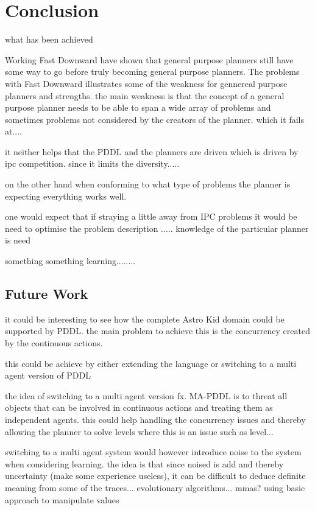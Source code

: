 \section{Conclusion}

what has been achieved

Working Fast Downward have shown that general purpose planners still have some way to go before truly becoming general purpose planners. The problems with Fast Downward illustrates some of the weakness for gennereal purpose planners and strengths. the main weakness is that the concept of a general purpose planner needs to be able to span a wide array of problems and sometimes problems not considered by the creators of the planner. which it fails at....

it neither helps that the PDDL and the planners are driven which is driven by ipc competition. 
 since it limits the diversity..... 
 
 on the other hand when conforming to what type of problems the planner is expecting everything works well.
 
 one would expect that if straying a little away from IPC problems it would be need to optimise the problem description ..... knowledge of the particular planner is need
 
 
 
 
 something something learning........
 
 
\subsection{Future Work}

	it could be interesting to see how the complete Astro Kid domain could be supported by PDDL. the main problem to achieve this is the concurrency created by the continuous actions.
	
	
	this could be achieve by either extending the language or switching to a multi agent version of PDDL

	
	the idea of switching to a multi agent version fx. MA-PDDL is to threat all objects that can be involved in continuous actions and treating them as independent agents. this could help handling the concurrency issues and thereby allowing the planner to solve levels where this is an issue such as level... 
	
	switching to a multi agent system would however introduce noise to the system when considering learning.   
	the idea is that since noised is add and thereby uncertainty (make some experience useless), it can be difficult to deduce definite meaning from some of the traces...  evolutionary algorithms... mmas? using basic approach to manipulate values
	
